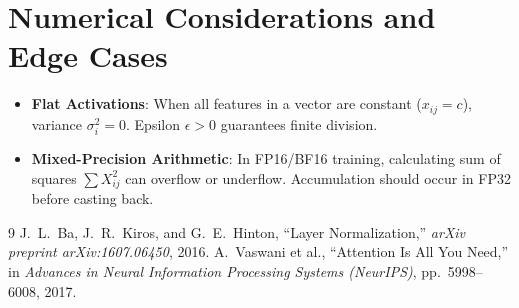 \documentclass[11pt,a4paper]{article}
\theoremstyle{definition}
\begin{document}
\section{Numerical Considerations and Edge Cases}

\begin{itemize}
    \item \textbf{Flat Activations}: When all features in a vector are constant ($x_{ij} = c$), variance $\sigma_i^2 = 0$. Epsilon $\epsilon > 0$ guarantees finite division.
    \item \textbf{Mixed-Precision Arithmetic}: In FP16/BF16 training, calculating sum of squares $\sum X_{ij}^2$ can overflow or underflow. Accumulation should occur in FP32 before casting back.
\end{itemize}

\begin{thebibliography}{9}
 J.~L.~Ba, J.~R.~Kiros, and G.~E.~Hinton, ``Layer Normalization,'' \emph{arXiv preprint arXiv:1607.06450}, 2016.
 A.~Vaswani et al., ``Attention Is All You Need,'' in \emph{Advances in Neural Information Processing Systems (NeurIPS)}, pp.~5998--6008, 2017.
\end{thebibliography}
\end{document}
